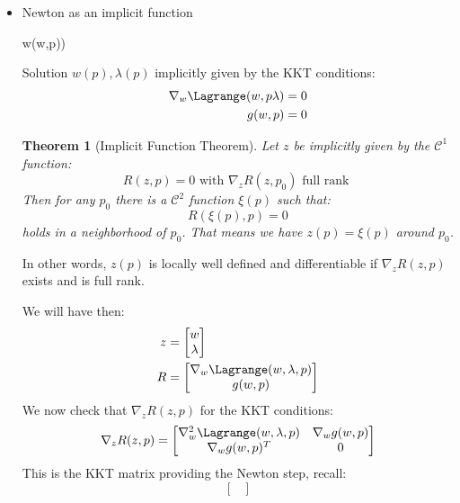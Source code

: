 \documentclass{article}
\newtheorem{theorem}{Theorem}[section]
\theoremstyle{example}
\theoremstyle{definition}
\theoremstyle{assumption}
\theoremstyle{lemma}
\begin{document}
	\begin{itemize}
		\item Newton as an implicit function
			\begin{mini!}
				{w}{\Phi(w,p))}{}{}
			\end{mini!}
		Solution $w(p),\lambda(p)$ implicitly given by the KKT conditions:
			\begin{align*}
				\nabla_w\Lagrange(w,p\lambda)&=0\\
				g(w,p)&=0
			\end{align*}
			\begin{theorem}[Implicit Function Theorem]
				Let $z$ be implicitly given by the $\mathcal{C}^1$ function:
				\begin{equation*}
				R(z,p)=0 \text{ with } \nabla_zR(z,p_0) \text { full rank }
				\end{equation*}
				Then for any $p_0$ there is a $\mathcal{C}^2$ function $\xi(p)$ such that:
				\begin{equation*}
					R(\xi(p),p)=0
				\end{equation*}
				holds in a neighborhood of $p_0$. That means we have $z(p)=\xi(p)$ around $p_0$.
			\end{theorem}
			In other words, $z(p)$ is locally well defined and differentiable if $\nabla_zR(z,p)$ exists and is full rank.
			\par
			We will have then:
			\begin{align*}
				z&=
				\begin{bmatrix}
					w\\ \lambda
				\end{bmatrix}\\
				R&=
				\begin{bmatrix}
					\nabla_w\Lagrange(w,\lambda,p)\\
					g(w,p)
				\end{bmatrix}
			\end{align*}
			We now check that $\nabla_z R(z,p)$ for the KKT conditions:
			\begin{equation*}
				\nabla_z R(z,p)=
					\begin{bmatrix}
						\nabla_w^2\Lagrange(w,\lambda,p) & \nabla_wg(w,p)\\
						\nabla_wg(w,p)^T & 0
					\end{bmatrix}
			\end{equation*}
			This is the KKT matrix providing the Newton step, recall:
			\begin{equation*}
				\begin{bmatrix}

\end{bmatrix}
\end{equation*}
\end{itemize}
\end{document}
